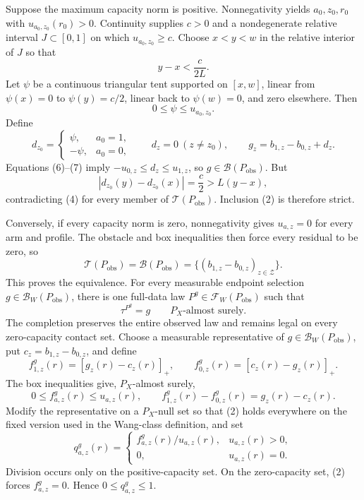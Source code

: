 Suppose the maximum capacity norm is positive.  Nonnegativity yields \(a_0,z_0,r_0\) with \(u_{a_0,z_0}(r_0)>0\).  Continuity supplies \(c>0\) and a nondegenerate relative interval \(J\subset[0,1]\) on which \(u_{a_0,z_0}\geq c\).  Choose \(x<y<w\) in the relative interior of \(J\) so that
\[
y-x<\frac{c}{2L}.
\tag{5}
\]
Let \(\psi\) be a continuous triangular tent supported on \([x,w]\), linear from \(\psi(x)=0\) to \(\psi(y)=c/2\), linear back to \(\psi(w)=0\), and zero elsewhere.  Then
\[
0\leq\psi\leq u_{a_0,z_0}.
\tag{6}
\]
Define
\[
d_{z_0}=
\begin{cases}
\psi,&a_0=1,\\
-\psi,&a_0=0,
\end{cases}
\qquad
d_z=0\ (z\neq z_0),\qquad
g_z=b_{1,z}-b_{0,z}+d_z.
\tag{7}
\]
Equations (6)--(7) imply \(-u_{0,z}\leq d_z\leq u_{1,z}\), so \(g\in\mathcal B(P_{\mathrm{obs}})\).  But
\[
|d_{z_0}(y)-d_{z_0}(x)|=\frac c2>L(y-x),
\tag{8}
\]
contradicting (4) for every member of \(\mathcal T(P_{\mathrm{obs}})\).  Inclusion (2) is therefore strict.

Conversely, if every capacity norm is zero, nonnegativity gives \(u_{a,z}=0\) for every arm and profile.  The obstacle and box inequalities then force every residual to be zero, so
\[
\mathcal T(P_{\mathrm{obs}})
=\mathcal B(P_{\mathrm{obs}})
=\{(b_{1,z}-b_{0,z})_{z\in\mathcal Z}\}.
\]
This proves the equivalence.
For every measurable endpoint selection \(g\in\mathcal B_W(P_{\mathrm{obs}})\), there is one full-data law \(P^g\in\mathcal F_W(P_{\mathrm{obs}})\) such that
\[
\tau^{P^g}=g\qquad P_X\text{-almost surely}.
\]
The completion preserves the entire observed law and remains legal on every zero-capacity contact set.
Choose a measurable representative of \(g\in\mathcal B_W(P_{\mathrm{obs}})\), put \(c_z=b_{1,z}-b_{0,z}\), and define
\[
f^g_{1,z}(r)=[g_z(r)-c_z(r)]_+,\qquad
f^g_{0,z}(r)=[c_z(r)-g_z(r)]_+.
\tag{1}
\]
The box inequalities give, \(P_X\)-almost surely,
\[
0\leq f^g_{a,z}(r)\leq u_{a,z}(r),\qquad
f^g_{1,z}(r)-f^g_{0,z}(r)=g_z(r)-c_z(r).
\tag{2}
\]
Modify the representative on a \(P_X\)-null set so that (2) holds everywhere on the fixed version used in the Wang-class definition, and set
\[
q^g_{a,z}(r)=
\begin{cases}
f^g_{a,z}(r)/u_{a,z}(r),&u_{a,z}(r)>0,\\
0,&u_{a,z}(r)=0.
\end{cases}
\tag{3}
\]
Division occurs only on the positive-capacity set.  On the zero-capacity set, (2) forces \(f^g_{a,z}=0\).  Hence \(0\leq q^g_{a,z}\leq1\).

